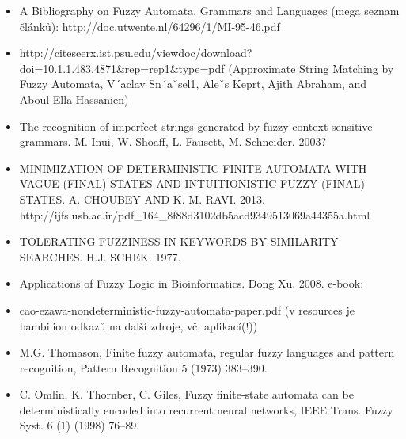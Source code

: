 \documentclass[a4paper,10pt]{article}
\begin{document}
\begin{itemize}
 \item A Bibliography on Fuzzy Automata, Grammars and Languages (mega seznam článků): http://doc.utwente.nl/64296/1/MI-95-46.pdf
 \item http://citeseerx.ist.psu.edu/viewdoc/download?doi=10.1.1.483.4871\&rep=rep1\&type=pdf (Approximate String Matching by Fuzzy
Automata, V´aclav Sn´aˇsel1, Aleˇs Keprt, Ajith Abraham, and Aboul Ella Hassanien)
 \item The recognition of imperfect strings generated by fuzzy context sensitive grammars. M. Inui, W. Shoaff, L. Fausett, M. Schneider. 2003?
 \item MINIMIZATION OF DETERMINISTIC FINITE AUTOMATA WITH VAGUE (FINAL) STATES AND INTUITIONISTIC FUZZY (FINAL) STATES. A. CHOUBEY AND K. M. RAVI. 2013. http://ijfs.usb.ac.ir/pdf\_164\_8f88d3102db5acd9349513069a44355a.html
 \item TOLERATING FUZZINESS IN KEYWORDS BY SIMILARITY SEARCHES. H.J. SCHEK. 1977. 
 \item Applications of Fuzzy Logic in Bioinformatics. Dong Xu. 2008. e-book: %
 \item cao-ezawa-nondeterministic-fuzzy-automata-paper.pdf (v resources je bambilion odkazů na další zdroje, vč. aplikací(!))
 \item M.G. Thomason, Finite fuzzy automata, regular fuzzy languages and pattern recognition, Pattern Recognition 5 (1973) 383–390.
 \item C. Omlin, K. Thornber, C. Giles, Fuzzy finite-state automata can be deterministically encoded into recurrent neural networks, IEEE Trans.
Fuzzy Syst. 6 (1) (1998) 76–89.

 
 \end{itemize}
\end{document}

